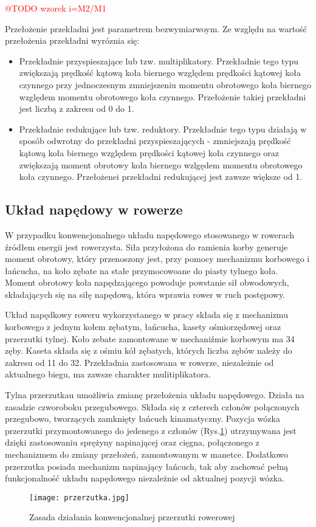 \textcolor{red}{@TODO wzorek i=M2/M1}

Przełożenie przekładni jest parametrem bezwymiarwoym. Ze względu na wartość przełożenia przekładni wyróznia się:
\begin{itemize}
\item
Przekładnie przyspieszające lub tzw. multiplikatory. Przekładnie tego typu zwiększają prędkość kątową koła biernego względem prędkości kątowej koła czynnego przy jednoczesnym zmniejszeniu momentu obrotowego koła biernego względem momentu obrotowego koła czynnego. Przełożenie takiej przekładni jest liczbą z zakresu od 0 do 1.
\item
Przekładnie redukujące lub tzw. reduktory. Przekładnie tego typu działają w sposób odwrotny do przekładni przyspieszających - zmniejszają prędkość kątową koła biernego względem prędkości kątowej koła czynnego oraz zwiększają moment obrotowy koła biernego wzlgędem momentu obrotowego koła czynnego. Przełożenei przekładni redukującej jest zawsze większe od 1.
\end{itemize} 
\subsection{Układ napędowy w rowerze}
W przypadku konwencjonalnego układu napędowego stosowanego w rowerach źródłem energii jest rowerzysta. Siła przyłożona do ramienia korby generuje moment obrotowy, który przenoszony jest, przy pomocy mechanizmu korbowego i łańcucha, na koło zębate na stałe przymocowoane do piasty tylnego koła. Moment obrotowy koła napędzającego powoduje powstanie sił obwodowych, składających się na siłę napędową, która wprawia rower w ruch postępowy.

Układ napędkowy roweru wykorzystanego w pracy składa się z mechanizmu korbowego z jednym kołem zębatym, łańcucha, kasety ośmiorzędowej oraz przerzutki tylnej. Koło zebate zamontowane w mechaniźmie korbowym ma 34 zęby. Kaseta składa się z ośmiu kół zębatych, których liczba zębów należy do zakresu od 11 do 32. Przekładnia zastosowana w rowerze, niezależnie od aktualnego biegu, ma zawsze charakter mulitiplikatora.

Tylna przerzutkau umożliwia zmianę przełożenia układu napędowego. Działa na zasadzie czworoboku przegubowego. Składa się z czterech członów połączonych przegubowo, tworzących zamknięty łańcuch kinamatyczny. Pozycja wózka przerzutki przymontowanego do jedenego z członów (Rys.\ref{fig:przerzutka}) utrzymywana jest dzięki zastosowaniu sprężyny napinającej oraz cięgna, połączonego z mechanizmem do zmiany przełożeń, zamontowanym w manetce. Dodatkowo przerzutka posiada mechanizm napinający łańcuch, tak aby zachować pełną funkcjonalność układu napędowego niezależnie od aktualnej pozycji wózka. 
\begin{figure}[h]
    \centering
    \texttt{[image: przerzutka.jpg]}
    \caption{Zasada działania konwencjonalnej przerzutki rowerowej}
    \label{fig:przerzutka}
\end{figure}


